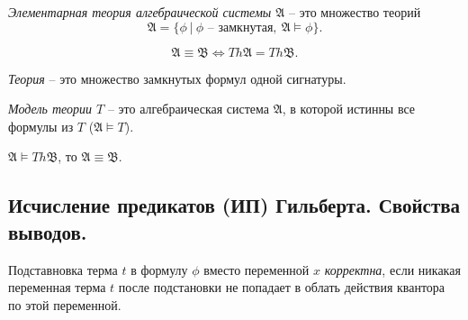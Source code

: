 \begin{definition}
    \emph{Элементарная теория алгебраической системы $ \mathfrak{A} $} -- это множество теорий
    \[
        \mathfrak{A} = \big\{\phi \ \big| \ \phi \text{ -- замкнутая}, \ \mathfrak{A}\vDash \phi\big\}.
    \]
\end{definition}

\begin{remark}
    \[
        \mathfrak{A} \equiv \mathfrak{B} \iff Th \mathfrak{A} = Th \mathfrak{B}.
    \]
\end{remark}

\begin{definition}[Теория]
    \emph{Теория} -- это множество замкнутых формул одной сигнатуры.
\end{definition}

\begin{definition}
    \emph{Модель теории $ T $} -- это алгебраическая система $ \mathfrak{A} $, в которой истинны все формулы из $ T $ ($ \mathfrak{A} \vDash T $).
\end{definition}

\begin{note}
    $ \mathfrak{A} \vDash Th \mathfrak{B} $, то $ \mathfrak{A} \equiv \mathfrak{B} $.
\end{note}

\subsection{Исчисление предикатов (ИП) Гильберта. Свойства выводов.}

\begin{definition}
    Подставновка терма $ t $ в формулу $ \phi $ вместо переменной $ x $ \emph{корректна}, если никакая переменная терма $ t $ после подстановки не попадает в облать действия квантора по этой переменной.
\end{definition}

